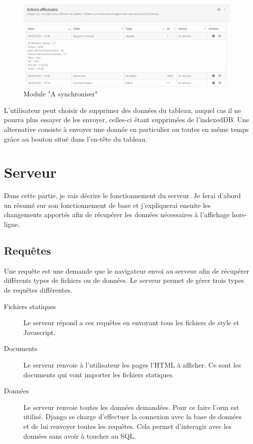 \documentclass{EPL-master-thesis-covers-FR}
\begin{document}
				\begin{figure}[H]
					\centering
					\includegraphics[width=1\textwidth]{images/tosync}
					\caption{Module "A synchroniser"}
					\label{fig:tosync}
				\end{figure}
							
				L'utilisateur peut choisir de supprimer des données du tableau, auquel cas il ne pourra plus essayer de les envoyer, celles-ci étant supprimées de l'indexedDB. Une alternative consiste à envoyer une donnée en particulier ou toutes en même temps grâce au bouton situé dans l'en-tête du tableau.
			
		
		\section{Serveur}
		\label{sec:serveur}
			Dans cette partie, je vais décrire le fonctionnement du serveur. Je ferai d'abord un résumé sur son fonctionnement de base et j'expliquerai ensuite les changements apportés afin de récupérer les données nécessaires à l'affichage hors-ligne.
			
			\subsection*{Requêtes}
				Une requête est une demande que le navigateur envoi au serveur afin de récupérer différents types de fichiers ou de données. Le serveur permet de gérer trois types de requêtes différentes.
				
				\begin{description}
					\item[Fichiers statiques] Le serveur répond a ces requêtes en envoyant tous les fichiers de style et Javascript.
					\item[Documents] Le serveur renvoie à l'utilisateur les pages l'HTML à afficher. Ce sont les documents qui vont importer les fichiers statiques.
					\item[Données] Le serveur renvoie toutes les données demandées. Pour ce faire l'\Gls{orm} est utilisé. Django se charge d'effectuer la connexion avec la base de données et de lui renvoyer toutes les requêtes. Cela permet d'interagir avec les données sans avoir à toucher au SQL.
				\end{description}
\end{document}
